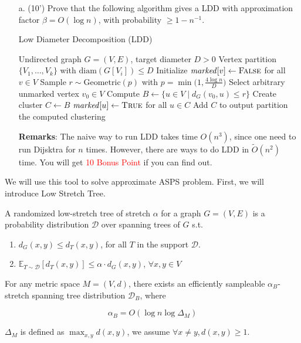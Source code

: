     \begin{itemize}
        \item [a. (10')] Prove that the following algorithm gives a LDD with approximation factor $\beta = O(\log n)$, with probability $\ge 1 - n ^ {-1}$.
\begin{algorithm}[H]
\caption{Low Diameter Decomposition (LDD)}
\label{alg:ldd}
\begin{algorithmic}[1]
\Require Undirected graph $G=(V,E)$, target diameter $D > 0$
\Ensure Vertex partition $\{V_1,\dots,V_k\}$ with $\mathrm{diam}(G[V_i]) \leq D$
\State Initialize $\mathit{marked}[v] \gets \textsc{False}$ for all $v \in V$
\State Sample $r \sim \mathrm{Geometric}(p)$ with $p = \min\big(1, \frac{4\log n}{D}\big)$
    \State Select arbitrary unmarked vertex $v_0 \in V$
    \State Compute $B \gets \{u \in V \mid d_G(v_0,u) \leq r\}$
    \State Create cluster $C \gets B$ 
    \State $\mathit{marked}[u] \gets \textsc{True}$ for all $u \in C$
    \State Add $C$ to output partition
\EndWhile
\State \Return the computed clustering
\end{algorithmic}
\end{algorithm}
\noindent \textbf{Remarks}: The naive way to run LDD takes time $O(n ^ 3)$, since one need to run Dijsktra for $n$ times. However, there are ways to do LDD in $\tilde{O}(n ^ 2)$ time. You will get \textcolor{red}{10 Bonus Point} if you can find out. 
    \end{itemize}


We will use this tool to solve approximate ASPS problem. First, we will introduce Low Stretch Tree. 


\begin{definition}
    A randomized low-stretch tree of stretch  $\alpha$ for a graph $G=(V,E)$ is a probability distribution $\mathcal{D}$ over spanning trees of $G$ s.t.
    \begin{enumerate}
        \item $d_G(x, y) \le d_T(x, y)$, for all $T$ in the support $\mathcal{D}$.
        \item $\mathbb{E}_{T\sim \mathcal{D}}[d_T(x, y)] \le \alpha \cdot d_G(x,y)$, $\forall x, y \in V$
        
    \end{enumerate}
\end{definition}

\begin{theorem}\label{LST}
    For any metric space $M=(V, d)$, there exists an efficiently sampleable $\alpha_B$-stretch spanning tree distribution $\mathcal{D}_B$, where

$$
\alpha_B=O\left(\log n \log \Delta_M\right)
$$

$\Delta_M$ is defined as $\max_{x, y} d(x, y)$, we assume $\forall x\neq y, d(x, y) \ge 1$. 

\end{theorem}

